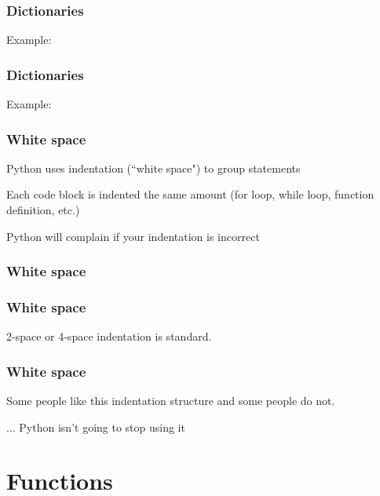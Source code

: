 \documentclass{beamer}
\begin{document}
\begin{frame}
\frametitle{Dictionaries}

Example:


\end{frame}


\begin{frame}
\frametitle{Dictionaries}

Example:


\end{frame}


\begin{frame}
\frametitle{White space}

Python uses indentation (``white space") to group statements

\vspace{0.15in}

Each code block is indented the same amount (for loop, while loop, function definition, etc.)

\vspace{0.15in}

Python will complain if your indentation is incorrect
\end{frame}

\begin{frame}
\frametitle{White space}


\end{frame}


\begin{frame}
\frametitle{White space}


2-space or 4-space indentation is standard.

\end{frame}

\begin{frame}
\frametitle{White space}

Some people like this indentation structure and some people do not.

\vspace{0.2in}

... Python isn't going to stop using it

\end{frame}

\section{Functions}
\end{document}
